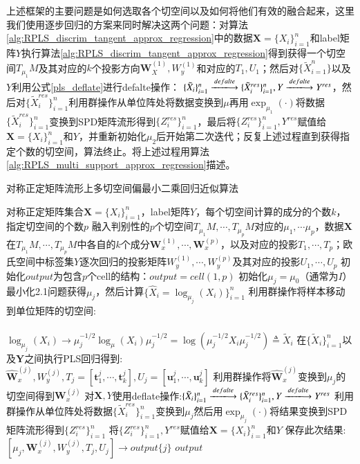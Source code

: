 上述框架的主要问题是如何选取各个切空间以及如何将他们有效的融合起来，这里我们使用逐步回归的方案来同时解决这两个问题：对算法\ref{alg:RPLS_discrim_tangent_approx_regression}中的数据$\bm{X}=\{X_i\}_{i=1}^{n}$和label矩阵${Y}$执行算法\ref{alg:RPLS_discrim_tangent_approx_regression}得到获得一个切空间$T_{\mu_1}M$及其对应的$k$个投影方向$\bm{W}_{X}^{(1)},W_{y}^{(1)}$和对应的$T_{1},U_{1}$；然后对$\{\tilde{X}_{i=1}^{n}\}$以及$Y$利用公式\ref{pls_deflate}进行defalte操作：%
$\{\tilde{X}_{i}\}_{i=1}^{n} \xlongrightarrow{defalte} \{\tilde{X}^{res}_i\}_{i=1}^{n},{Y}\xlongrightarrow{defalte} {Y}^{res}$，然后对$\{\tilde{X}^{res}_{i}\}_{i=1}^{n}$利用群操作从单位阵处将数据变换到$\mu$再用$\exp_{\mu_{1}}(\cdot)$将数据$\{\tilde{X}^{res}_i\}_{i=1}^{n}$变换到SPD矩阵流形得到$\{Z^{res}_{i}\}_{i=1}^{n}$，最后将$\{Z^{res}_i\}_{i=1}^{n},{Y}^{res}$赋值给$\bm{X}=\{X_i\}_{i=1}^{n}$和$Y$，并重新初始化$\mu_2$后开始第二次迭代；反复上述过程直到获得指定个数的切空间，算法终止。将上述过程用算法\ref{alg:RPLS_multi_support_approx_regression}描述。
\begin{algorithm}[htb]
\caption{对称正定矩阵流形上多切空间偏最小二乘回归近似算法}
\label{alg:RPLS_multi_support_approx_regression}
\begin{algorithmic}[1]
\REQUIRE 对称正定矩阵集合$\bm{X}=\{X_i\}_{i=1}^{n}$，label矩阵${Y}$，每个切空间计算的成分的个数$k$，指定切空间的个数$p$
\ENSURE 融入判别性的$p$个切空间$T_{\mu_1}M,\cdots,T_{\mu_{p}}M$对应的$\mu_{1},\cdots \mu_{p}$，数据$\bm{X}$在$T_{\mu_1}M,\cdots,T_{\mu_{p}}M$中各自的$k$个成分$\bm{W}_{x}^{(1)},\cdots,\bm{W}_{x}^{(p)}$，以及对应的投影$T_1,\cdots,T_{p}$；欧氏空间中标签集${Y}$逐次回归的投影矩阵$W_{y}^{(1)},\cdots,W_{y}^{(p)}$及其对应的投影$U_1,\cdots,U_{p}$
\STATE 初始化$output$为包含$p$个cell的结构：$output=cell(1,p)$
	\STATE 初始化$\mu_j=\mu_0$（通常为$I$）最小化2.1问题获得$\mu_j$，然后计算$\{\hat{X}_i=\log_{\mu_j}(X_i)\}_{i=1}^{n}$
	\STATE 利用群操作将样本移动到单位矩阵的切空间:\\
 	~~~~~~~~~~~~~~~~~~~~$\log_{\mu_{j}}(X_i)\rightarrow \mu_{j}^{-1/2}\log_{\mu}(X_i)\mu_{j}^{-1/2}=\log(\mu_{j}^{-1/2}X_i\mu_{j}^{-1/2})\triangleq \tilde{X}_i$
	\STATE 在$\{\tilde{X}_{i}\}_{i=1}^{n}$以及$\bm{Y}$之间执行PLS回归得到:\\
	$\hat{\bm{W}}_{x}^{(j)},W_{y}^{(j)},T_{j}=[\bm{t}_{1}^{j},\cdots,\bm{t}_{k}^{j}],U_j=[\bm{u}_{1}^{j},\cdots,\bm{u}_{k}^{j}]$
	\STATE 利用群操作将$\hat{\bm{W}}_{x}^{(j)}$变换到$\mu_{j}$的切空间得到$\bm{W}_{x}^{(j)}$
	\STATE 对$\bm{X},{Y}$使用deflate操作:$\{\tilde{X}_{i}\}_{i=1}^{n} \xlongrightarrow{defalte} \{\tilde{X}^{res}_{i}\}_{i=1}^{n},{Y}\xlongrightarrow{defalte} {Y}^{res}$
	\STATE 利用群操作从单位阵处将数据$\{\tilde{X}^{res}_{i}\}_{i=1}^{n}$变换到$\mu_{j}$然后用$\exp_{\mu_{j}}(\cdot)$将结果变换到SPD矩阵流形得到$\{Z^{res}_{i}\}_{i=1}^{n}$
	\STATE 将$\{Z^{res}_{i}\}_{i=1}^{n},{Y^{res}}$赋值给$\bm{X}=\{X_i\}_{i=1}^{n}$和${Y}$
	\STATE 保存此次结果:$[\mu_{j},\bm{W}_{x}^{(j)},W_{y}^{(j)},T_{j},U_{j}]\rightarrow output\{j\}$
\ENDFOR
\RETURN $output$
\end{algorithmic}
\end{algorithm}

